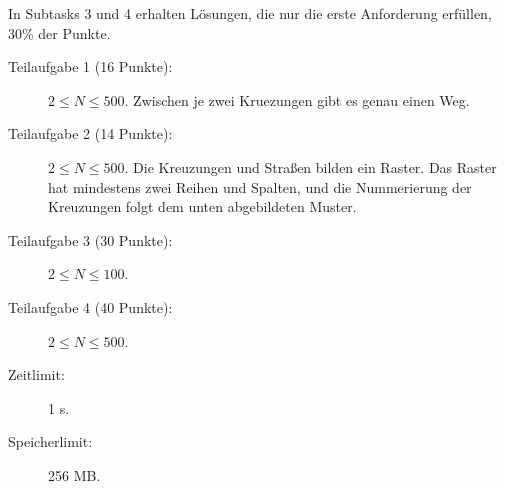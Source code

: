 \documentclass{boi2014-de}
\begin{document}
    In Subtasks 3 und 4 erhalten Lösungen, 
    die nur die erste Anforderung erfüllen, 30\% der Punkte.

    \begin{description}
        \item[Teilaufgabe 1 (16 Punkte):] $2 \le N \le 500$. 
        Zwischen je zwei Kruezungen gibt es genau einen Weg.
        \item[Teilaufgabe 2 (14 Punkte):] $2 \le N \le 500$. 
        Die Kreuzungen und Straßen bilden ein Raster.  Das Raster hat mindestens zwei Reihen und Spalten,
        und die Nummerierung der Kreuzungen folgt dem unten abgebildeten Muster.
        \begin{figure}[h!]
           \centering
        \end{figure}
        \item[Teilaufgabe 3 (30 Punkte):] $2 \le N \le 100$.
        \item[Teilaufgabe 4 (40 Punkte):] $2 \le N \le 500$.
    \end{description}

    \Constraints
    
    \begin{description}
        \item[Zeitlimit:] 1 s.
        \item[Speicherlimit:] 256 MB.
    \end{description}

\end{document}
